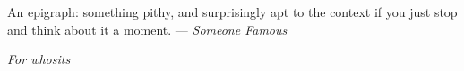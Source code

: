 \thispagestyle{empty}
{}

\vspace*{3cm}

\begin{center}
    An epigraph: something pithy, and surprisingly apt to the context if you just stop and think about it a moment.
    \medskip
    \hfill--- \emph{Someone Famous}
\end{center}

\vspace{13em}

\begin{center}
    \emph{For whosits}
\end{center}
